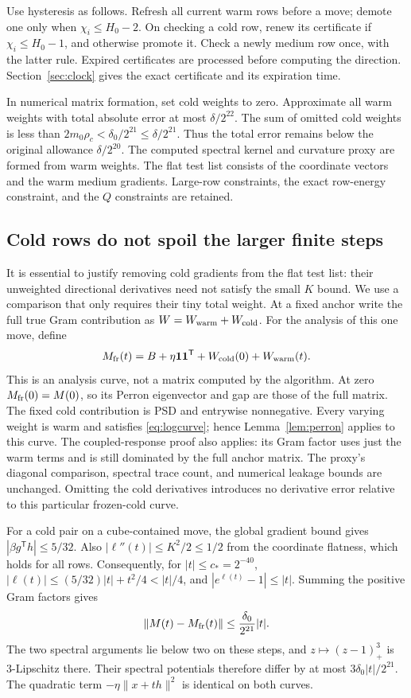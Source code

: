\documentclass[11pt]{amsart}
\theoremstyle{remark}\newtheorem{remark}[theorem]{Remark}
\newcommand{\one}{\mathbf 1}
\newcommand{\T}{\mathsf T}
\begin{document}
Use hysteresis as follows. Refresh all current warm rows before a move;
demote one only when $\chi_i\le H_0-2$. On checking a cold row, renew its
certificate if $\chi_i\le H_0-1$, and otherwise promote it. Check a newly
medium row once, with the latter rule. Expired certificates are processed
before computing the direction. Section~\ref{sec:clock} gives the exact
certificate and its expiration time.

In numerical matrix formation, set cold weights to zero. Approximate all
warm weights with total absolute error at most $\delta/2^{22}$.
The sum of omitted cold weights is less than
$2m_0\rho_c<\delta_0/2^{21}\le\delta/2^{21}$.
Thus the total error remains below the original allowance
$\delta/2^{20}$. The computed spectral kernel and curvature proxy are
formed from warm weights. The flat test list consists of the coordinate
vectors and the warm medium gradients. Large-row constraints, the exact
row-energy constraint, and the $Q$ constraints are retained.

\subsection{Cold rows do not spoil the larger finite steps}\label{sec:coldstep}
It is essential to justify removing cold gradients from the flat test
list: their unweighted directional derivatives need not satisfy the small
$K$ bound. We use a comparison that only requires their tiny total weight.
At a fixed anchor write the full true Gram contribution as
$W=W_{\rm warm}+W_{\rm cold}$. For the analysis of this one move, define
\[
 M_{\rm fr}(t)=B+\eta\one\one^\T+W_{\rm cold}(0)+W_{\rm warm}(t).
\]
This is an analysis curve, not a matrix computed by the algorithm.
At zero $M_{\rm fr}(0)=M(0)$, so its Perron eigenvector and gap are those
of the full matrix. The fixed cold contribution is PSD and entrywise
nonnegative. Every varying weight is warm and satisfies
\eqref{eq:logcurve}; hence Lemma~\ref{lem:perron} applies to this curve.
The coupled-response proof also applies: its Gram factor uses just the
warm terms and is still dominated by the full anchor matrix.
The proxy's diagonal comparison, spectral trace count, and numerical
leakage bounds are unchanged. Omitting the cold derivatives introduces
no derivative error relative to this particular frozen-cold curve.

For a cold pair on a cube-contained move, the global gradient bound gives
$|\beta g^\T h|\le5/32$. Also
$|\ell''(t)|\le K^2/2\le1/2$ from the coordinate flatness, which holds
for all rows. Consequently, for $|t|\le c_*=2^{-40}$,
$|\ell(t)|\le(5/32)|t|+t^2/4<|t|/4$, and
$|e^{\ell(t)}-1|\le|t|$. Summing the positive Gram factors gives
\begin{equation}\label{eq:coldmotion}
 \|M(t)-M_{\rm fr}(t)\|\le\frac{\delta_0}{2^{21}}|t|.
\end{equation}
The two spectral arguments lie below two on these steps, and
$z\mapsto(z-1)_+^3$ is 3-Lipschitz there. Their spectral potentials
therefore differ by at most $3\delta_0|t|/2^{21}$.
The quadratic term $-\eta\|x+th\|^2$ is identical on both curves.
\end{document}
